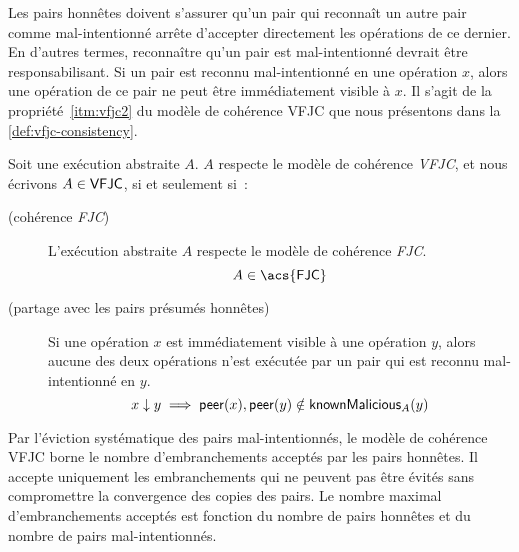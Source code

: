 Les pairs honnêtes doivent s'assurer qu'un pair qui reconnaît un autre pair comme mal-intentionné arrête d'accepter directement les opérations de ce dernier.
En d'autres termes, reconnaître qu'un pair est mal-intentionné devrait être responsabilisant.
Si un pair est reconnu mal-intentionné en une opération $x$, alors une opération de ce pair ne peut être immédiatement visible à $x$.
Il s'agit de la propriété~\ref{itm:vfjc2} du modèle de cohérence \acf{VFJC} que nous présentons dans la \autoref{def:vfjc-consistency}.

\begin{definition}\label{def:vfjc-consistency}
  Soit une exécution abstraite $A$. $A$ respecte le modèle de cohérence \emph{\acf{VFJC}}, et nous écrivons $A \in \operatorname{\mathsf{VFJC}}$, si et seulement si~:

  \begin{description}
  \item[ (cohérence \emph{\acl{FJC}})]
  L'exécution abstraite $A$ respecte le modèle de cohérence \emph{\ac{FJC}}.
  \begin{equation*}
    A \in \trm{\acs{FJC}}
  \end{equation*}

  \item[ (partage avec les pairs présumés honnêtes)]
  Si une opération $x$ est immédiatement visible à une opération $y$, alors aucune des deux opérations n'est exécutée par un pair qui est reconnu mal-intentionné en $y$.
  \begin{equation*}
    x \downarrow y \implies \operatorname{\mathsf{peer}}(x), \operatorname{\mathsf{peer}}(y) \notin \operatorname{\mathsf{knownMalicious}}_A(y)
  \end{equation*}
  \end{description}
\end{definition}

Par l'éviction systématique des pairs mal-intentionnés, le modèle de cohérence \ac{VFJC} borne le nombre d'embranchements acceptés par les pairs honnêtes.
Il accepte uniquement les embranchements qui ne peuvent pas être évités sans compromettre la convergence des copies des pairs.
Le nombre maximal d'embranchements acceptés est fonction du nombre de pairs honnêtes et du nombre de pairs mal-intentionnés.

